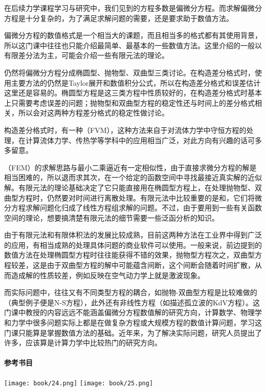 在后续力学课程学习与研究中，我们见到的方程多数是偏微分方程。而求解偏微分方程是十分复杂的，为了满足求解问题的需要，还是要求助于数值方法。

偏微分方程的数值格式是一个相当大的课题，而且相当多的格式都有其使用背景，所以这门课中往往也只能介绍最简单、最基本的一些数值方法。这里介绍的一般以有限差分法为主，可能会介绍一些有限元法的理论。

仍然将偏微分方程分成椭圆型、抛物型、双曲型三类讨论。在构造差分格式时，使用主要方法的仍然是Taylor展开和数值积分公式，所以在构造差分格式和误差估计这里还是容易的。椭圆型方程是这三类方程中性质较好的，在构造差分格式时基本上只需要考虑误差的问题；抛物型和双曲型方程的稳定性还与时间上的差分格式相关，所以会对这两种方程差分格式的稳定性做讨论。

构造差分格式时，有一种（FVM），这种方法来自于对流体力学中守恒方程的处理，在计算流体力学、传热学等学科中的应用相当广泛，对此方向有兴趣的话可多多留意。

（FEM）的求解思路与最小二乘逼近有一定相似性，由于直接求微分方程的解是相当困难的，所以退而求其次，在一个给定的函数空间中寻找最接近真实解的近似解。有限元法的理论基础决定了它只能直接用在椭圆型方程上，在处理抛物型、双曲型方程时，仍然要对时间进行离散处理。有限元法中比较重要的是和，它们将微分方程求解问题化归成了线性方程组求解的问题。不过，由于要用到一些有关函数空间的理论，想要搞清楚有限元法的细节需要一些泛函分析的知识。

由于有限元法和有限体积法的发展比较成熟，目前这两种方法在工业界中得到广泛的应用，有相当成熟的处理具体问题的商业软件可以使用。一般来说，前边提到的数值方法在处理椭圆型方程时往往能获得不错的效果，抛物型方程次之，双曲型方程较差，这是由于双曲型方程的解中可能蕴含间断，这个间断会随着时间扩散，从而造成解的性质较差，例如反映在空气动力学上就是激波现象。

而实际问题中，往往又有不同类型方程的耦合，如抛物-双曲型方程是比较难做的（典型例子便是N-S方程），此外还有非线性方程（如描述孤立波的KdV方程）。这门课中教授的内容远远不能涵盖偏微分方程数值解的研究方向，计算数学、物理学和力学中很多问题实际上都是在做复杂方程或大规模方程的数值计算问题，学习这门课只能算是掌握数值方法的基础。近年来，为了解决实际问题，研究人员提出了许多，应该算是计算力学中比较热门的研究方向。



\paragraph{参考书目}\begin{center}
    \texttt{[image: book/24.png]} \quad
    \texttt{[image: book/25.png]}
\end{center}


